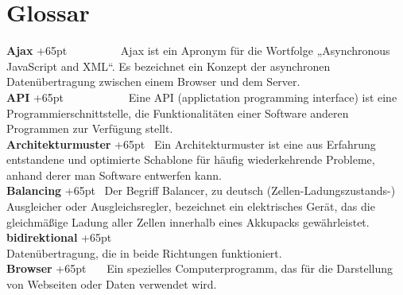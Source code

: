 \documentclass[fontsize = 12pt, paper = a4]{scrreprt}
\begin{document}








\chapter*{Glossar}



\textbf{Ajax}
\hangindent+65pt 
\ \ \ \ \ \ \ \ \ Ajax ist ein Apronym für die Wortfolge „Asynchronous JavaScript and XML“. Es bezeichnet ein Konzept der asynchronen Datenübertragung zwischen einem Browser und dem Server.\\

\textbf{API}
\hangindent+65pt 
\ \ \ \ \ \ \ \ \ \ \ Eine API (applictation programming interface) ist eine Programmierschnitt\-stelle, die Funktionalitäten einer Software anderen Programmen zur Verfügung stellt.\\

\textbf{Architekturmuster}
\hangindent+65pt 
\ Ein Architekturmuster ist eine aus Erfahrung entstandene und optimierte Schablone für häufig wiederkehrende Probleme, anhand derer man Software entwerfen kann.\\

\textbf{Balancing}
\hangindent+65pt 
\ Der Begriff Balancer, zu deutsch (Zellen-Ladungszustands-) Ausgleicher oder Ausgleichsregler, bezeichnet ein elektrisches Gerät, das die gleichmäßige Ladung aller Zellen innerhalb eines Akkupacks gewährleistet.\\

\textbf{bidirektional}
\hangindent+65pt  \\
Datenübertragung, die in beide Richtungen funktioniert. \\

\textbf{Browser}
\hangindent+65pt 
\ \ \ Ein spezielles Computerprogramm, das für die Darstellung von Webseiten oder Daten verwendet wird.\\
\end{document}
